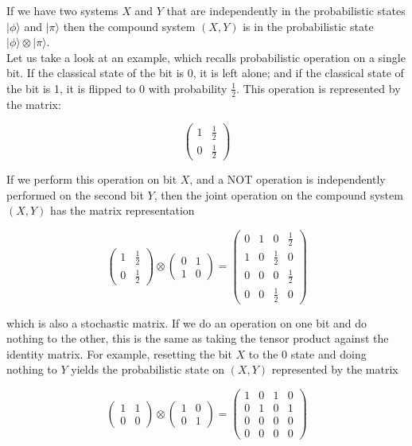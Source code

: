 \documentclass[svgnames]{article}     %
\begin{document}
If we have two systems $X$ and $Y$ that are independently in the probabilistic states $|\phi\rangle$ and $|\pi\rangle$ then the compound system $(X, Y)$ is in the probabilistic state $|\phi\rangle \otimes |\pi\rangle $. \\

Let us take a look at an example, which recalls probabilistic operation on a single bit. If the classical state of the bit is 0, it is left alone; and if the classical state of the bit is 1, it is flipped to 0 with probability $\frac{1}{2}$. This operation is represented by the matrix: 

\[
\begin{pmatrix}
  1 & \frac{1}{2} \\[4px]
  0 & \frac{1}{2} 
\end{pmatrix} 
\] \vspace{5px}

If we perform this operation on bit $X$, and a NOT operation is independently performed on the second bit $Y$, then the joint operation on the compound system $(X, Y)$ has the matrix representation 

\[
\begin{pmatrix}
  1 & \frac{1}{2} \\[4px]
  0 & \frac{1}{2} 
\end{pmatrix} \otimes \begin{pmatrix}
  0 & 1 \\[4px] 1 & 0
\end{pmatrix} = \begin{pmatrix}
  0 & 1 & 0 & \frac{1}{2} \\[4px] 1 & 0 & \frac{1}{2} & 0 \\[4px] 0 & 0 & 0 & \frac{1}{2} \\[4px] 0 & 0 & \frac{1 }{2} & 0
\end{pmatrix}
\] \vspace{5px}

which is also a stochastic matrix. If we do an operation on one bit and do nothing to the other, this is the same as taking the tensor product against the identity matrix. For example, resetting the bit $X$ to the 0 state and doing nothing to $Y$ yields the probabilistic state on $(X, Y)$ represented by the matrix

\[
\begin{pmatrix}
  1 & 1 \\[4px]
  0 & 0 
\end{pmatrix} \otimes \begin{pmatrix}
  1 & 0 \\[4px]
  0 & 1 
\end{pmatrix} = \begin{pmatrix}
  1 & 0 & 1 & 0 \\ 0 & 1 & 0 & 1 \\ 0 & 0 & 0 & 0 \\ 0 & 0 & 0 & 0
\end{pmatrix} 
\] \vspace{5px}
\newpage 
\end{document}
